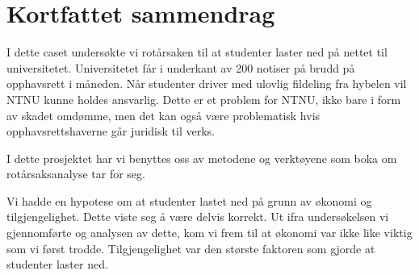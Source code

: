 \chapter*{Kortfattet sammendrag}
I dette caset undersøkte vi rotårsaken til at studenter laster ned på nettet til universitetet. Universitetet får i underkant av 200 notiser på brudd på opphavsrett i måneden. Når studenter driver med ulovlig fildeling fra hybelen vil NTNU kunne holdes ansvarlig. Dette er et problem for NTNU, ikke bare i form av skadet omdømme, men det kan også være problematisk hvis opphavsrettshaverne går juridisk til verks. 

I dette prosjektet har vi benyttes oss av metodene og verktøyene som boka om rotårsaksanalyse \cite{RCA} tar for seg.

Vi hadde en hypotese om at studenter lastet ned på grunn av økonomi og tilgjengelighet. Dette viste seg å være delvis korrekt. Ut ifra undersøkelsen vi gjennomførte og analysen av dette, kom vi frem til at økonomi var ikke like viktig som vi først trodde. Tilgjengelighet var den største faktoren som gjorde at studenter laster ned. 
    